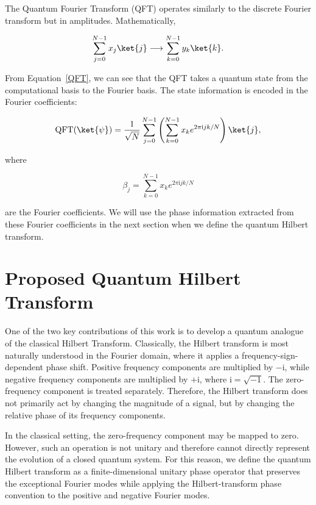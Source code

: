 \documentclass[11pt]{article}
\theoremstyle{plain}
\theoremstyle{definition}
\theoremstyle{remark}
\begin{document}
The Quantum Fourier Transform (QFT) operates similarly to the discrete Fourier transform but in amplitudes. Mathematically,

\begin{equation}
\sum_{j=0}^{N-1}x_j\ket{j}
\longrightarrow
\sum_{k=0}^{N-1}y_k\ket{k}.
\label{QFT}
\end{equation}

From Equation~\eqref{QFT}, we can see that the QFT takes a quantum state from the computational basis to the Fourier basis. The state information is encoded in the Fourier coefficients:

\begin{equation}
\operatorname{QFT}(\ket{\psi})
=
\frac{1}{\sqrt{N}}
\sum_{j=0}^{N-1}
\left(
\sum_{k=0}^{N-1}
x_k e^{2\pi \mathrm{i}jk/N}
\right)
\ket{j},
\label{qft-fourier}
\end{equation}

where

\begin{equation}
\beta_j
=
\sum_{k=0}^{N-1}
x_k e^{2\pi \mathrm{i}jk/N}
\end{equation}

are the Fourier coefficients. We will use the phase information extracted from these Fourier coefficients in the next section when we define the quantum Hilbert transform.

\section{Proposed Quantum Hilbert Transform}
\label{QHT}

One of the two key contributions of this work is to develop a quantum analogue of the classical Hilbert Transform. Classically, the Hilbert transform is most naturally understood in the Fourier domain, where it applies a frequency-sign-dependent phase shift. Positive frequency components are multiplied by $-\mathrm{i}$, while negative frequency components are multiplied by $+\mathrm{i}$, where $\mathrm{i}=\sqrt{-1}$. The zero-frequency component is treated separately. Therefore, the Hilbert transform does not primarily act by changing the magnitude of a signal, but by changing the relative phase of its frequency components.

In the classical setting, the zero-frequency component may be mapped to zero. However, such an operation is not unitary and therefore cannot directly represent the evolution of a closed quantum system. For this reason, we define the quantum Hilbert transform as a finite-dimensional unitary phase operator that preserves the exceptional Fourier modes while applying the Hilbert-transform phase convention to the positive and negative Fourier modes.
\end{document}
